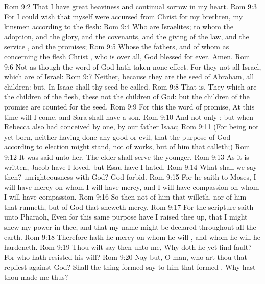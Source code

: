 \vs Rom 9:2 That I have great heaviness and continual sorrow in my heart.
\vs Rom 9:3 For I could wish that myself were accursed from Christ for my brethren, my kinsmen according to the flesh:
\vs Rom 9:4 Who are Israelites; to whom  the adoption, and the glory, and the covenants, and the giving of the law, and the service , and the promises;
\vs Rom 9:5 Whose  the fathers, and of whom as concerning the flesh Christ , who is over all, God blessed for ever. Amen.
\vs Rom 9:6 Not as though the word of God hath taken none effect. For they  not all Israel, which are of Israel:
\vs Rom 9:7 Neither, because they are the seed of Abraham,  all children: but, In Isaac shall thy seed be called.
\vs Rom 9:8 That is, They which are the children of the flesh, these  not the children of God: but the children of the promise are counted for the seed.
\vs Rom 9:9 For this  the word of promise, At this time will I come, and Sara shall have a son.
\vs Rom 9:10 And not only ; but when Rebecca also had conceived by one,  by our father Isaac;
\vs Rom 9:11 (For  being not yet born, neither having done any good or evil, that the purpose of God according to election might stand, not of works, but of him that calleth;)
\vs Rom 9:12 It was said unto her, The elder shall serve the younger.
\vs Rom 9:13 As it is written, Jacob have I loved, but Esau have I hated.
\vs Rom 9:14 What shall we say then?  unrighteousness with God? God forbid.
\vs Rom 9:15 For he saith to Moses, I will have mercy on whom I will have mercy, and I will have compassion on whom I will have compassion.
\vs Rom 9:16 So then  not of him that willeth, nor of him that runneth, but of God that sheweth mercy.
\vs Rom 9:17 For the scripture saith unto Pharaoh, Even for this same purpose have I raised thee up, that I might shew my power in thee, and that my name might be declared throughout all the earth.
\vs Rom 9:18 Therefore hath he mercy on whom he will , and whom he will he hardeneth.
\vs Rom 9:19 Thou wilt say then unto me, Why doth he yet find fault? For who hath resisted his will?
\vs Rom 9:20 Nay but, O man, who art thou that repliest against God? Shall the thing formed say to him that formed , Why hast thou made me thus?
